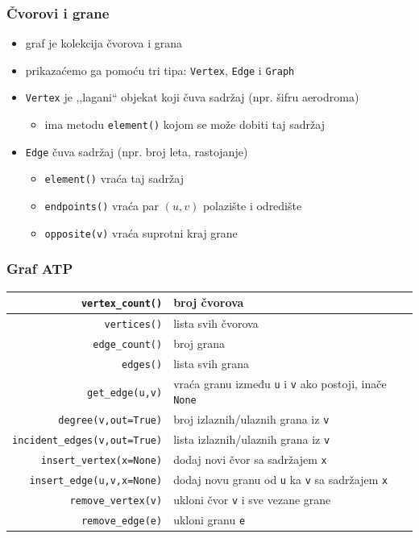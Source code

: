 \documentclass[compress,aspectratio=169]{beamer}
\begin{document}
\begin{frame}[fragile]
  \frametitle{Čvorovi i grane}
  \begin{itemize}
    \item graf je kolekcija čvorova i grana
    \item prikazaćemo ga pomoću tri tipa: \texttt{Vertex}, \texttt{Edge} 
    i \texttt{Graph}
    \item \texttt{Vertex} je ,,lagani`` objekat koji čuva sadržaj (npr.
    šifru aerodroma)
    \begin{itemize}
      \item ima metodu \texttt{element()} kojom se može dobiti taj sadržaj
    \end{itemize}
    \item \texttt{Edge} čuva sadržaj (npr. broj leta, rastojanje)
    \begin{itemize}
      \item \texttt{element()} vraća taj sadržaj
      \item \texttt{endpoints()} vraća par $(u,v)$ polazište i odredište
      \item \texttt{opposite(v)} vraća suprotni kraj grane
    \end{itemize}
  \end{itemize}
\end{frame}

\begin{frame}[fragile]
  \frametitle{Graf ATP}
  {%
  \begin{tabular}{r|p{6cm}}
    \texttt{vertex\_count()} & broj čvorova \\ \hline
    \texttt{vertices()} & lista svih čvorova \\ \hline
    \texttt{edge\_count()} & broj grana \\ \hline
    \texttt{edges()} & lista svih grana \\ \hline
    \texttt{get\_edge(u,v)} & vraća granu između \texttt{u} i \texttt{v}
      ako postoji, inače \texttt{None} \\ \hline
    \texttt{degree(v,out=True)} & broj izlaznih/ulaznih grana iz 
      \texttt{v} \\ \hline
    \texttt{incident\_edges(v,out=True)} & lista izlaznih/ulaznih grana 
      iz \texttt{v} \\ \hline
    \texttt{insert\_vertex(x=None)} & dodaj novi čvor sa sadržajem 
      \texttt{x} \\ \hline
    \texttt{insert\_edge(u,v,x=None)} & dodaj novu granu od \texttt{u} 
      ka \texttt{v} sa sadržajem \texttt{x}\\ \hline
    \texttt{remove\_vertex(v)} & ukloni čvor \texttt{v} i sve vezane 
      grane \\ \hline
    \texttt{remove\_edge(e)} & ukloni granu \texttt{e} \\
  \end{tabular}
  }
\end{frame}
\end{document}
